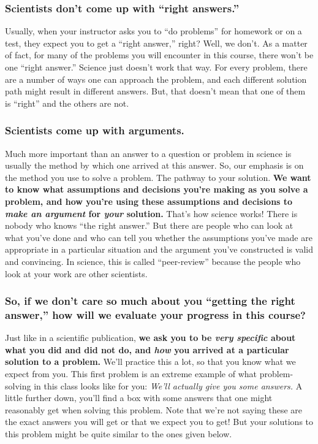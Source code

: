 \label{fnt1.1.1-1}
\subsubsection*{Scientists don't come up with ``right answers.''}

Usually, when your instructor asks you to ``do problems'' for homework or on a test, they expect you to get a ``right answer,'' right? Well, we don't. As a matter of fact, for many of the problems you will encounter in this course, there won't be one ``right answer.'' Science just doesn't work that way. For every problem, there are a number of ways one can approach the problem, and each different solution path might result in different answers. But, that doesn't mean that one of them is ``right'' and the others are not.

\subsubsection*{Scientists come up with arguments.}

Much more important than an answer to a question or problem in science is usually the method by which one arrived at this answer. So, our emphasis is on the method you use to solve a problem. The pathway to your solution. \textbf{We want to know what assumptions and decisions you're making as you solve a problem, and how you're using these assumptions and decisions to \emph{make an argument} for \emph{your} solution.} That's how science works! There is nobody who knows ``the right answer.'' But there are people who can look at what you've done and who can tell you whether the assumptions you've made are appropriate in a particular situation and the argument you've constructed is valid and convincing. In science, this is called ``peer-review'' because the people who look at your work are other scientists.

\subsubsection*{So, if we don't care so much about you ``getting the right answer,'' how will we evaluate your progress in this course?}

Just like in a scientific publication, \textbf{we ask you to be \emph{very specific} about what you did and did not do, and \emph{how} you arrived at a particular solution to a problem.} We'll practice this a lot, so that you know what we expect from you. This first problem is an extreme example of what problem-solving in this class looks like for you: \emph{We'll actually give you some answers.} A little further down, you'll find a box with some answers that one might reasonably get when solving this problem. Note that we're not saying these are the exact answers you will get or that we expect you to get! But your solutions to this problem might be quite similar to the ones given below.


